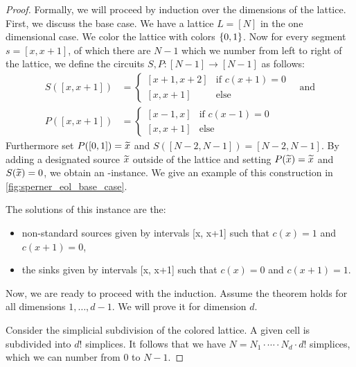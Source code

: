 \begin{proof}
	Formally, we will proceed by induction over the dimensions of the lattice. First, we discuss the base case. We have a lattice $L = [N]$ in the one dimensional case. We color the lattice with colors $\left\{0, 1\right\}$. Now for every segment $s = [x, x+1]$, of which there are $N-1$ which we number from left to right of the lattice, we define the circuits $S, P : [N-1] \rightarrow [N-1]$ as follows:
	\begin{align*}
		S([x, x+1]) & = \begin{cases}
			                [x + 1, x+2] & \text{if $c(x+1) = 0$} \\
			                [x, x+1]     & \text{else}
		                \end{cases} \quad \text{and} \\
		P([x, x+1]) & = \begin{cases}
			                [x - 1, x] & \text{if $c(x-1) = 0$} \\
			                [x, x+1]   & \text{else}
		                \end{cases}
	\end{align*}
	Furthermore set $P([0, 1]) = \widetilde{x}$ and $S([N-2, N-1]) = [N-2, N-1]$. By adding a designated source $\widetilde{x}$ outside of the lattice and setting $P(\widetilde{x}) = \widetilde{x}$ and $S(\widetilde{x}) = 0$, we obtain an \EndOfLine-instance. We give an example of this construction in \cref{fig:sperner_eol_base_case}.

	The solutions of this instance are the:
	\begin{itemize}
		\item non-standard sources given by intervals [x, x+1] such that $c(x) = 1$ and $c(x+1) = 0$,
		\item the sinks given by intervals [x, x+1] such that $c(x) = 0$ and $c(x+1) = 1$.
	\end{itemize}
	Now, we are ready to proceed with the induction. Assume the theorem holds for all dimensions $1, \dots, d-1$. We will prove it for dimension $d$.

	Consider the simplicial subdivision of the colored lattice. A given cell is subdivided into ${d!}$ simplices. It follows that we have $N = N_1 \cdot \cdots \cdot N_d \cdot {d!}$ simplices, which we can number from $0$ to $N-1$.


\end{proof}
